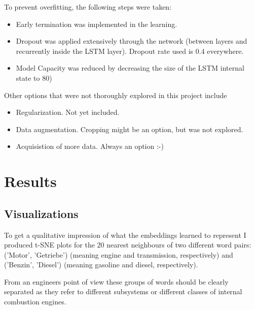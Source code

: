 \documentclass[10pt,a4paper]{article}
\begin{document}
	To prevent overfitting, the following steps were taken:
	\begin{itemize}
		\item Early termination was implemented in the learning. 
		\item Dropout was applied extensively through the network (between layers and recurrently inside the LSTM layer). Dropout rate used is 0.4 everywhere.
		\item Model Capacity was reduced by decreasing the size of the LSTM internal state to 80)
	\end{itemize}
    Other options that were not thoroughly explored in this project include
	\begin{itemize}
		\item Regularization. Not yet included.
		\item Data augmentation. Cropping might be an option, but was not explored.
		\item Acquisistion of more data. Always an option :-)
	\end{itemize}
	\section{Results}
	\subsection{Visualizations}
	To get a qualitative impression of what the embeddings learned to represent I produced t-SNE plots for the 20 nearest neighbours of two different word pairs: ('Motor', 'Getriebe') (meaning engine and transmission, respectively) and ('Benzin', 'Diesel') (meaning gasoline and diesel, respectively). 
	
	From an engineers point of view these groups of words should be clearly separated as they refer to different subsystems or different classes of internal combustion engines.
	
\end{document}
